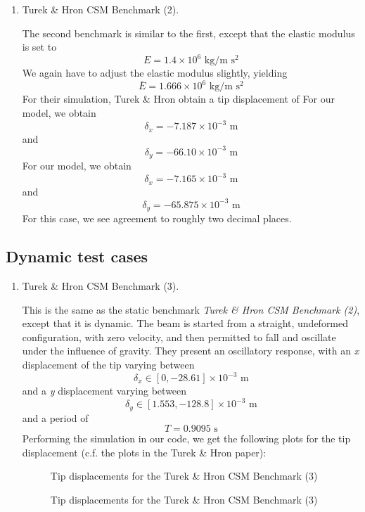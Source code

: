 \documentclass{article}
\begin{document}
\begin{enumerate}
\item Turek \& Hron CSM Benchmark (2).

The second benchmark is similar to the first, except that the elastic modulus is set to
\[ E = 1.4 \times 10^6 \mbox{ kg/m s$^2$} \]
We again have to adjust the elastic modulus slightly, yielding
\[ \bar{E} = 1.666 \times 10^6 \mbox{ kg/m s$^2$} \]
For their simulation, Turek \& Hron obtain a tip displacement of 
For our model, we obtain
\[ \delta_x = -7.187 \times 10^{-3} \mbox{ m} \]
and 
\[ \delta_y = -66.10 \times 10^{-3} \mbox{ m} \]
For our model, we obtain
\[ \delta_x = -7.165 \times 10^{-3} \mbox{ m} \]
and 
\[ \delta_y = -65.875 \times 10^{-3} \mbox{ m} \]
For this case, we see agreement to roughly two decimal places.

\end{enumerate}
\subsection{Dynamic test cases}
\begin{enumerate}
\item Turek \& Hron CSM Benchmark (3).

This is the same as the static benchmark \emph{Turek \& Hron CSM Benchmark (2)}, except that it is dynamic. 
The beam is started from a straight, undeformed configuration, with zero velocity, and then permitted to fall and oscillate under the influence of gravity.
They present an oscillatory response, with an \emph{x} displacement of the tip varying between
\[ \delta_x \in [0,-28.61] \times 10^{-3} \mbox{ m} \]
and a \emph{y} displacement varying between
\[ \delta_y \in [1.553,-128.8] \times 10^{-3} \mbox{ m} \]
and a period of
\[ T = 0.9095 \mbox{ s} \]
Performing the simulation in our code, we get the following plots for the tip displacement (c.f. the plots in the Turek \& Hron paper):
\begin{figure}[ht]
        \centering
        \caption{Tip displacements for the Turek \& Hron CSM Benchmark (3)}
\end{figure}

\begin{figure}[ht]
        \centering
        \caption{Tip displacements for the Turek \& Hron CSM Benchmark (3)}
\end{figure}
\end{enumerate}
\end{document}
